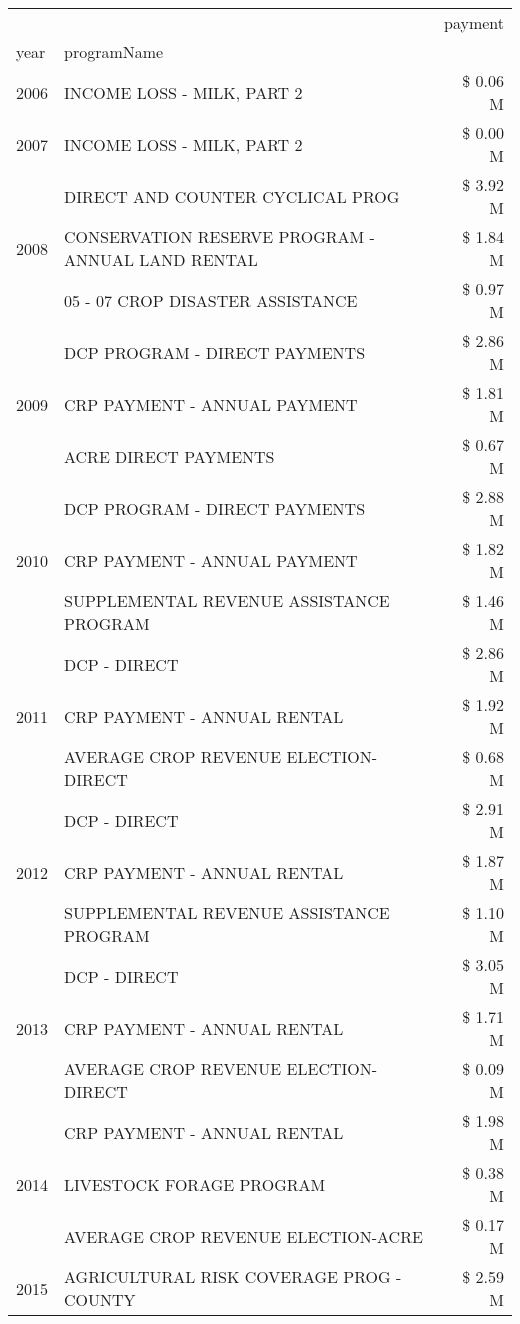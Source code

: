 \begin{tabular}{llr}
\toprule
 &  & payment \\
year & programName &  \\
\midrule
2006 & INCOME LOSS - MILK, PART 2 & \$ 0.06 M \\
\cline{1-3}
2007 & INCOME LOSS - MILK, PART 2 & \$ 0.00 M \\
\cline{1-3}
\multirow[t]{3}{*}{2008} & DIRECT AND COUNTER CYCLICAL PROG & \$ 3.92 M \\
 & CONSERVATION RESERVE PROGRAM - ANNUAL LAND RENTAL & \$ 1.84 M \\
 & 05 - 07 CROP DISASTER ASSISTANCE & \$ 0.97 M \\
\cline{1-3}
\multirow[t]{3}{*}{2009} & DCP PROGRAM - DIRECT PAYMENTS & \$ 2.86 M \\
 & CRP PAYMENT - ANNUAL PAYMENT & \$ 1.81 M \\
 & ACRE DIRECT PAYMENTS & \$ 0.67 M \\
\cline{1-3}
\multirow[t]{3}{*}{2010} & DCP PROGRAM - DIRECT PAYMENTS & \$ 2.88 M \\
 & CRP PAYMENT - ANNUAL PAYMENT & \$ 1.82 M \\
 & SUPPLEMENTAL REVENUE ASSISTANCE PROGRAM & \$ 1.46 M \\
\cline{1-3}
\multirow[t]{3}{*}{2011} & DCP - DIRECT & \$ 2.86 M \\
 & CRP PAYMENT - ANNUAL RENTAL & \$ 1.92 M \\
 & AVERAGE CROP REVENUE ELECTION-DIRECT & \$ 0.68 M \\
\cline{1-3}
\multirow[t]{3}{*}{2012} & DCP - DIRECT & \$ 2.91 M \\
 & CRP PAYMENT - ANNUAL RENTAL & \$ 1.87 M \\
 & SUPPLEMENTAL REVENUE ASSISTANCE PROGRAM & \$ 1.10 M \\
\cline{1-3}
\multirow[t]{3}{*}{2013} & DCP - DIRECT & \$ 3.05 M \\
 & CRP PAYMENT - ANNUAL RENTAL & \$ 1.71 M \\
 & AVERAGE CROP REVENUE ELECTION-DIRECT & \$ 0.09 M \\
\cline{1-3}
\multirow[t]{3}{*}{2014} & CRP PAYMENT - ANNUAL RENTAL & \$ 1.98 M \\
 & LIVESTOCK FORAGE PROGRAM & \$ 0.38 M \\
 & AVERAGE CROP REVENUE ELECTION-ACRE & \$ 0.17 M \\
\cline{1-3}
\multirow[t]{3}{*}{2015} & AGRICULTURAL RISK COVERAGE PROG - COUNTY & \$ 2.59 M \\

\end{tabular}
